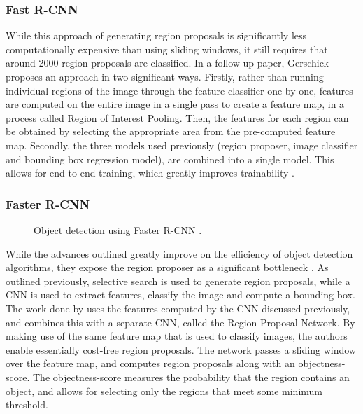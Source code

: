 \documentclass[\rootfolder/main.tex]{subfiles}
\begin{document}
\subsubsection{Fast R-CNN}

While this approach of generating region proposals is significantly less computationally expensive than using sliding windows, it still requires that around 2000 region proposals are classified.
In a follow-up paper, Gerschick proposes an approach in two significant ways.
Firstly, rather than running individual regions of the image through the feature classifier one by one, features are computed on the entire image in a single pass to create a feature map, in a process called Region of Interest Pooling.
Then, the features for each region can be obtained by selecting the appropriate area from the pre-computed feature map.
Secondly, the three models used previously (region proposer, image classifier and bounding box regression model), are combined into a single model.
This allows for end-to-end training, which greatly improves trainability \cite{Girschick2015}.

\subsubsection{Faster R-CNN}

\begin{wrapfigure}{r}{0.4\columnwidth}
    \caption{Object detection using Faster R-CNN \cite{Ren2017}.}
    \label{fig:faster-rcnn}
\end{wrapfigure}

While the advances outlined greatly improve on the efficiency of object detection algorithms, they expose the region proposer as a significant bottleneck \cite{Ren2017}.
As outlined previously, selective search is used to generate region proposals, while a CNN is used to extract features, classify the image and compute a bounding box.
The work done by \cite{Ren2007} uses the features computed by the CNN discussed previously, and combines this with a separate CNN, called the Region Proposal Network.
By making use of the same feature map that is used to classify images, the authors enable essentially cost-free region proposals.
The network passes a sliding window over the feature map, and computes region proposals along with an objectness-score.
The objectness-score measures the probability that the region contains an object, and allows for selecting only the regions that meet some minimum threshold.
\end{document}

